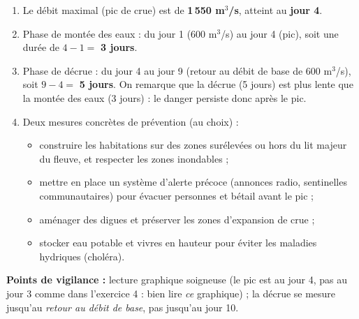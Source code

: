 \documentclass[11pt]{article}
\begin{document}
\begin{corrige}
\begin{enumerate}
\item Le débit maximal (pic de crue) est de \textbf{1\,550 m$^3$/s}, atteint au \textbf{jour 4}.
\item Phase de montée des eaux : du jour 1 (600 m$^3$/s) au jour 4 (pic), soit une durée de $4 - 1 =$ \textbf{3 jours}.
\item Phase de décrue : du jour 4 au jour 9 (retour au débit de base de 600 m$^3$/s), soit $9 - 4 =$ \textbf{5 jours}. On remarque que la décrue (5 jours) est plus lente que la montée des eaux (3 jours) : le danger persiste donc après le pic.
\item Deux mesures concrètes de prévention (au choix) :
\begin{itemize}
\item construire les habitations sur des zones surélevées ou hors du lit majeur du fleuve, et respecter les zones inondables ;
\item mettre en place un système d'alerte précoce (annonces radio, sentinelles communautaires) pour évacuer personnes et bétail avant le pic ;
\item aménager des digues et préserver les zones d'expansion de crue ;
\item stocker eau potable et vivres en hauteur pour éviter les maladies hydriques (choléra).
\end{itemize}
\end{enumerate}
\textbf{Points de vigilance :} lecture graphique soigneuse (le pic est au jour 4, pas au jour 3 comme dans l'exercice 4 : bien lire \emph{ce} graphique) ; la décrue se mesure jusqu'au \emph{retour au débit de base}, pas jusqu'au jour 10.
\end{corrige}
\end{document}
